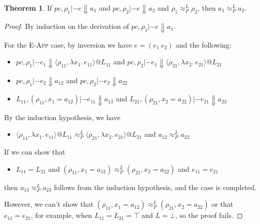 \documentclass{article}
\makeatletter
\newcommand{\at}{\ensuremath{{\scriptstyle{@}}}}
\newcommand{\pc}{\ensuremath{{\mathit{pc}}}}
\theoremstyle{definition}
\newtheorem{theorem}{Theorem}
\makeatother
\begin{document}
\begin{theorem}
  If $\pc, \rho_1 |- e \Downarrow a_1$ and $\pc, \rho_2 |- e \Downarrow a_2$
  and $\rho_1 \approx^{L}_{P} \rho_2$, then $a_1 \approx^{L}_{P} a_2$.
\end{theorem}
\begin{proof}
  By induction on the derivation of $\pc, \rho_1 |- e \Downarrow a_1$.

    For the \textsc{E-App} case, by inversion we have $e = (e_1\ e_2)$ and the
    following:
    \begin{itemize}
    \item
      $\pc, \rho_1 |- e_1 \Downarrow
      \langle{\rho_{11}, \lambda{x_1}.\, e_{11}\rangle} \at L_{11}$
      \quad and \quad
      $\pc, \rho_2 |- e_1 \Downarrow
      \langle{\rho_{21}, \lambda{x_2}.\, e_{21}\rangle} \at L_{21}$
    \item
      $\pc, \rho_1 |- e_2 \Downarrow a_{12}$
      \hspace{17.2ex} and \quad
      $\pc, \rho_2 |- e_2 \Downarrow a_{22}$
    \item
      $L_{11}, (\rho_{11}, x_1 = a_{12}) |- e_{11} \Downarrow a_{13}$
      \hspace{2.54ex} and \quad
      $L_{21}, (\rho_{21}, x_2 = a_{22}) |- e_{21} \Downarrow a_{23}$
    \end{itemize}
    By the induction hypothesis, we have
    \begin{itemize}
    \item
      $\langle{\rho_{11}, \lambda{x_1}.\, e_{11}\rangle} \at L_{11}
      \approx^{L}_{P}
      \langle{\rho_{21}, \lambda{x_2}.\, e_{21}\rangle} \at L_{21}$
      \quad and \quad
      $a_{12} \approx^{L}_{P} a_{22}$
    \end{itemize}
    If we can show that
    \begin{itemize}
    \item 
      $L_{11} = L_{21}$
      \quad and \quad
      $(\rho_{11}, x_1 = a_{12}) \approx^{L}_{P} (\rho_{21}, x_2 = a_{22})$
      \quad and \quad
      $e_{11} = e_{21}$
    \end{itemize}
    then $a_{13} \approx^{L}_{P} a_{23}$ follows from the induction hypothesis,
    and the case is completed.
    
    However, we can't show that
    $(\rho_{11}, x_1 = a_{12}) \approx^{L}_{P} (\rho_{21}, x_2 = a_{22})$
    or that
    $e_{11} = e_{21}$, for example, when $L_{11} = L_{21} = \top$ and $L = \bot$,
    so the proof fails.
\end{proof}
\end{document}
